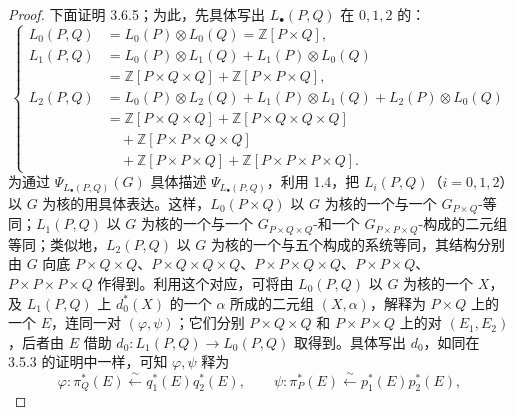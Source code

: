 \begin{proof}
下面证明 3.6.5；为此，先具体写出 $L_\bullet(P,Q)$ 在 $0,1,2$ 的：
\[
\left\{\begin{aligned}
L_0(P,Q)&=L_0(P)\otimes L_0(Q)=\mathbb Z[P\times Q],\\
L_1(P,Q)&=L_0(P)\otimes L_1(Q)+L_1(P)\otimes L_0(Q)\\
&=\mathbb Z[P\times Q\times Q]+\mathbb Z[P\times P\times Q],\\
L_2(P,Q)&=L_0(P)\otimes L_2(Q)+L_1(P)\otimes L_1(Q)+L_2(P)\otimes L_0(Q)\\
&=\mathbb Z[P\times Q\times Q]+\mathbb Z[P\times Q\times Q\times Q]\\
&\quad+\mathbb Z[P\times P\times Q\times Q]\\
&\quad+\mathbb Z[P\times P\times Q]+\mathbb Z[P\times P\times P\times Q].
\end{aligned}\right.\tag{3.6.6}
\]
为通过 $\Psi_{L_\bullet(P,Q)}(G)$ 具体描述 $\Psi_{L_\bullet(P,Q)}$，利用 1.4，把 $L_i(P,Q)$（$i=0,1,2$）以 $G$ 为核的用具体表达。这样，$L_0(P\times Q)$ 以 $G$ 为核的一个与一个 $G_{P\times Q}$-等同；$L_1(P,Q)$ 以 $G$ 为核的一个与一个 $G_{P\times Q\times Q}$-和一个 $G_{P\times P\times Q}$-构成的二元组等同；类似地，$L_2(P,Q)$ 以 $G$ 为核的一个与五个构成的系统等同，其结构分别由 $G$ 向底 $P\times Q\times Q$、$P\times Q\times Q\times Q$、$P\times P\times Q\times Q$、$P\times P\times Q$、$P\times P\times P\times Q$ 作得到。利用这个对应，可将由 $L_0(P,Q)$ 以 $G$ 为核的一个 $X$，及 $L_1(P,Q)$ 上 $d_0^*(X)$ 的一个 $\alpha$ 所成的二元组 $(X,\alpha)$，解释为 $P\times Q$ 上的一个 $E$，连同一对 $(\varphi,\psi)$；它们分别 $P\times Q\times Q$ 和 $P\times P\times Q$ 上的对 $(E_1,E_2)$，后者由 $E$ 借助
$d_0:L_1(P,Q)\to L_0(P,Q)$ 取得到。具体写出 $d_0$，如同在 3.5.3 的证明中一样，可知 $\varphi,\psi$ 释为
\[
\varphi:\pi_Q^*(E)\xleftarrow{\sim}q_1^*(E)q_2^*(E),\qquad
\psi:\pi_P^*(E)\xleftarrow{\sim}p_1^*(E)p_2^*(E),
\]

\end{proof}
